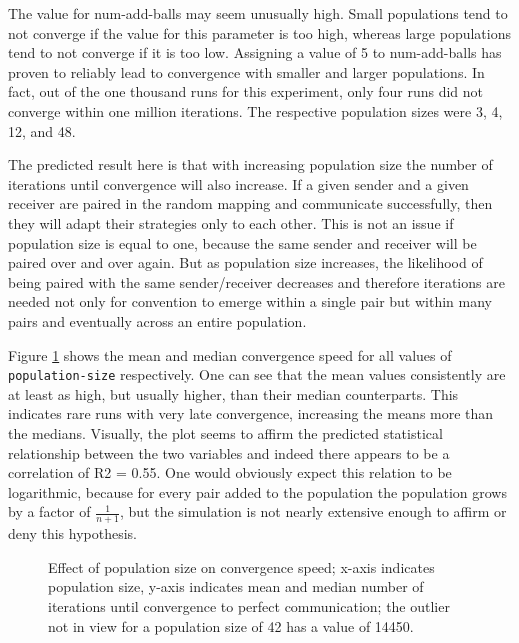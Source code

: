 \documentclass[DIV=calc,BCOR=0mm,pagesize]{scrartcl}
\newcommand{\code}[1]{\texttt{#1}}
\begin{document}
The value for num-add-balls may seem unusually high.
Small populations tend to not converge if the value for this parameter is too high, whereas large populations tend to not converge if it is too low.
Assigning a value of 5 to num-add-balls has proven to reliably lead to convergence with smaller and larger populations.
In fact, out of the one thousand runs for this experiment, only four runs did not converge within one million iterations.
The respective population sizes were 3, 4, 12, and 48.

The predicted result here is that with increasing population size the number of iterations until convergence will also increase.
If a given sender and a given receiver are paired in the random mapping and communicate successfully, then they will adapt their strategies only to each other.
This is not an issue if population size is equal to one, because the same sender and receiver will be paired over and over again.
But as population size increases, the likelihood of being paired with the same sender/receiver decreases and therefore iterations are needed not only for convention to emerge within a single pair but within many pairs and eventually across an entire population.

Figure \ref{fig:pop} shows the mean and median convergence speed for all values of \code{population-size} respectively.
One can see that the mean values consistently are at least as high, but usually higher, than their median counterparts.
This indicates rare runs with very late convergence, increasing the means more than the medians.
Visually, the plot seems to affirm the predicted statistical relationship between the two variables and indeed there appears to be a correlation of R2 = 0.55.
One would obviously expect this relation to be logarithmic, because for every pair added to the population the population grows by a factor of \(\frac{1}{n+1}\), but the simulation is not nearly extensive enough to affirm or deny this hypothesis.

\begin{figure}
	\centering
	\caption{Effect of population size on convergence speed; x-axis indicates population size, y-axis indicates mean and median number of iterations until convergence to perfect communication; the outlier not in view for a population size of 42 has a value of 14450.}
	\label{fig:pop}
\end{figure}
\end{document}
